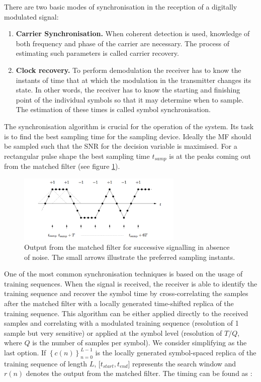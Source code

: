 \documentclass[12pt,a4paper,openright]{report}
\begin{document}
There are two basic modes of synchronisation in the reception of a digitally modulated signal:
\begin{enumerate}
\item \textbf{Carrier Synchronisation.}  When coherent detection is used, knowledge of both  frequency and phase of the carrier are necessary. The process of estimating such parameters is called carrier recovery.

\item \textbf{Clock recovery.} To perform demodulation the receiver has to know the instants of time that at which the modulation in the transmitter changes its state. In other words, the receiver has to know the starting and finishing point of the individual symbols so that it may determine when to sample. The estimation of these times is called symbol synchronisation.
\end{enumerate}

The synchronisation algorithm is crucial for the operation of the system. Its task is to find the best sampling time for the sampling device. Ideally the MF should be sampled such that the SNR for the decision variable is maximised. For a rectangular pulse shape the best sampling time $t_{samp}$ is at the peaks coming out from the matched filter (see figure \ref{fig:mfpeaks}).

 \begin{figure}[H]
  \centering
    \includegraphics[width=0.7\textwidth]{mfpeaks.pdf}
    \caption[Output from the matched filter for successive signalling in absence of noise]{Output from the matched filter for successive signalling in absence of noise. The small arrows illustrate the preferred sampling instants\cite{ProjectEQ2310}.}
    \label{fig:mfpeaks}
\end{figure}

One of the most common synchronisation techniques is based on the usage of training sequences. When the signal is received, the receiver is able to identify the training sequence and recover the symbol time by cross-correlating the samples after the matched filter with a locally generated time-shifted replica of the training sequence. This algorithm can be either applied directly to the received samples and correlating with a modulated training sequence (resolution of 1 sample but very sensitive) or applied at the symbol level (resolution of $T/Q$, where $Q$ is the number of samples per symbol). We consider simplifying as the last option. If ${\left\{ {c(n)} \right\}_{n = 0}^{L - 1}}$ is the locally generated symbol-spaced replica of the training sequence of length $L$, [$t_{start},t_{end}$] represents the search window and $r(n)$ denotes the output from the matched filter. The timing can be found as \cite{HaykinBook}:
\end{document}
